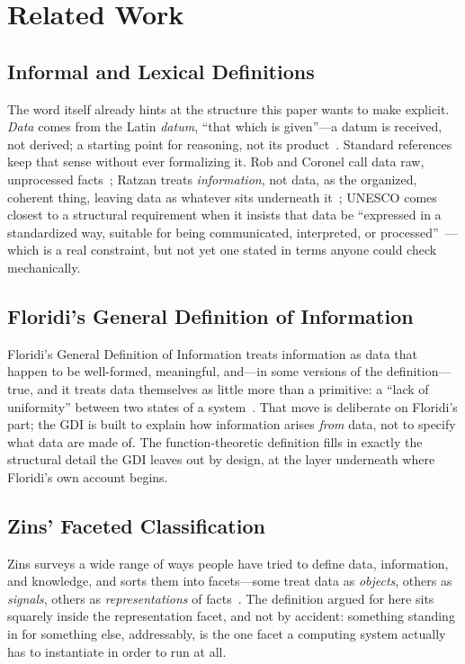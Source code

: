 \section{Related Work}
\label{sec:related}

\subsection{Informal and Lexical Definitions}

The word itself already hints at the structure this paper wants to make
explicit. \emph{Data} comes from the Latin \emph{datum}, ``that which is
given''---a datum is received, not derived; a starting point for
reasoning, not its product~\autocite{websters1934}. Standard references
keep that sense without ever formalizing it. Rob and Coronel call data
raw, unprocessed facts~\autocite{rob2013}; Ratzan treats
\emph{information}, not data, as the organized, coherent thing, leaving
data as whatever sits underneath it~\autocite{ratzan2004}; UNESCO comes
closest to a structural requirement when it insists that data be
``expressed in a standardized way, suitable for being communicated,
interpreted, or processed''~\autocite{unesco2008}---which is a real
constraint, but not yet one stated in terms anyone could check
mechanically.

\subsection{Floridi's General Definition of Information}

Floridi's General Definition of Information treats information as data
that happen to be well-formed, meaningful, and---in some versions of the
definition---true, and it treats data themselves as little more than a
primitive: a ``lack of uniformity'' between two states of a
system~\autocite{floridi2010}. That move is deliberate on Floridi's part;
the GDI is built to explain how information arises \emph{from} data, not
to specify what data are made of. The function-theoretic definition fills
in exactly the structural detail the GDI leaves out by design, at the
layer underneath where Floridi's own account begins.

\subsection{Zins' Faceted Classification}

Zins surveys a wide range of ways people have tried to define data,
information, and knowledge, and sorts them into facets---some treat data
as \emph{objects}, others as \emph{signals}, others as
\emph{representations} of facts~\autocite{zins2007}. The definition argued
for here sits squarely inside the representation facet, and not by
accident: something standing in for something else, addressably, is the
one facet a computing system actually has to instantiate in order to run
at all.

